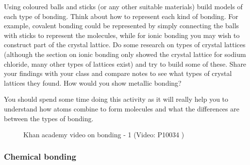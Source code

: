         \label{m38694*id87434}Using coloured balls and sticks (or any other suitable materials) build models of each type of bonding. Think about how to represent each kind of bonding. For example, covalent bonding could be represented by simply connecting the balls with sticks to represent the molecules, while for ionic bonding you may wish to construct part of the crystal lattice. Do some research on types of crystal lattices (although the section on ionic bonding only showed the crystal lattice for sodium chloride, many other types of lattices exist) and try to build some of these. Share your findings with your class and compare notes to see what types of crystal lattices they found. How would you show metallic bonding?\par 
        \label{m38694*id8754}You should spend some time doing this activity as it will really help you to understand how atoms combine to form molecules and what the differences are between the types of bonding. \par 
        
\label{m38694*eip-515}
    \setcounter{subfigure}{0}


	\begin{figure}[H] %
    
    
    \textnormal{Khan academy video on bonding - 1}\vspace{.1in} \nopagebreak
  \label{m38694*yt-media1}\label{m38694*yt-video1}
             { (Video:  P10034 )}
      
      \vspace{2pt}
    \vspace{.1in}
    
    

 \end{figure}   

    \addtocounter{footnote}{-0}
    \par \label{m38694*secfhsst!!!underscore!!!id617}
            \subsubsection{  Chemical bonding
        }
            \nopagebreak
            

